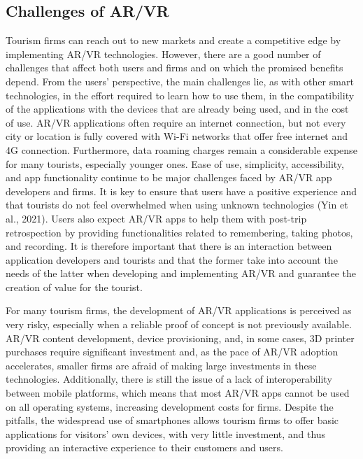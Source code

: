 \documentclass[
  letterpaper,
  DIV=11,
  numbers=noendperiod]{scrreprt}
\begin{document}
\hypertarget{challenges-of-arvr}{%
\subsection{Challenges of AR/VR}\label{challenges-of-arvr}}

Tourism firms can reach out to new markets and create a competitive edge
by implementing AR/VR technologies. However, there are a good number of
challenges that affect both users and firms and on which the promised
benefits depend. From the users' perspective, the main challenges lie,
as with other smart technologies, in the effort required to learn how to
use them, in the compatibility of the applications with the devices that
are already being used, and in the cost of use. AR/VR applications often
require an internet connection, but not every city or location is fully
covered with Wi-Fi networks that offer free internet and 4G connection.
Furthermore, data roaming charges remain a considerable expense for many
tourists, especially younger ones. Ease of use, simplicity,
accessibility, and app functionality continue to be major challenges
faced by AR/VR app developers and firms. It is key to ensure that users
have a positive experience and that tourists do not feel overwhelmed
when using unknown technologies (Yin et al., 2021). Users also expect
AR/VR apps to help them with post-trip retrospection by providing
functionalities related to remembering, taking photos, and recording. It
is therefore important that there is an interaction between application
developers and tourists and that the former take into account the needs
of the latter when developing and implementing AR/VR and guarantee the
creation of value for the tourist.

For many tourism firms, the development of AR/VR applications is
perceived as very risky, especially when a reliable proof of concept is
not previously available. AR/VR content development, device
provisioning, and, in some cases, 3D printer purchases require
significant investment and, as the pace of AR/VR adoption accelerates,
smaller firms are afraid of making large investments in these
technologies. Additionally, there is still the issue of a lack of
interoperability between mobile platforms, which means that most AR/VR
apps cannot be used on all operating systems, increasing development
costs for firms. Despite the pitfalls, the widespread use of smartphones
allows tourism firms to offer basic applications for visitors' own
devices, with very little investment, and thus providing an interactive
experience to their customers and users.
\end{document}
